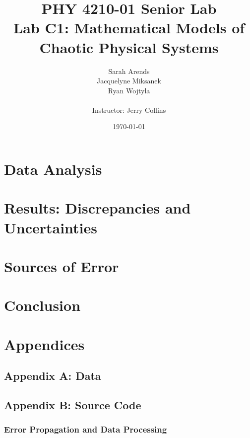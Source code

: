 \documentclass[a4paper]{article}
\title{PHY 4210-01 Senior Lab \\Lab C1:  Mathematical Models of Chaotic Physical Systems }
\author{Sarah Arends \\
        Jacquelyne Miksanek \\
        Ryan Wojtyla \\ \\
        Instructor: Jerry Collins}
\date{\today}
\begin{document}
\maketitle

\begin{abstract}

\qq 

\end{abstract}

\newpage

\tableofcontents

\newpage

\section{Data Analysis}

\begin{figure}[H]
\centering
\label{labelname}
\end{figure}

\section{Results: Discrepancies and Uncertainties}

\section{Sources of Error}
\qq 

\section{Conclusion}
\qq 

\section{Appendices}

\subsection{Appendix A: Data}

\subsection{Appendix B: Source Code}

\subsubsection{Error Propagation and Data Processing}
\end{document}
